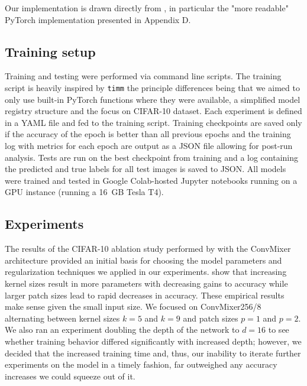 \documentclass[letterpaper]{article} %
\begin{document}
Our implementation is drawn directly from \citet{trockman2022patches}, in particular the "more readable" PyTorch implementation presented in Appendix D. 

\subsection{Training setup}

Training and testing were performed via command line scripts. The training script is heavily inspired by \verb|timm| \citep{rw2019timm} the principle differences being that we aimed to only use built-in PyTorch functions where they were available, a simplified model registry structure and the focus on CIFAR-10 dataset. Each experiment is defined in a YAML file and fed to the training script. Training checkpoints are saved only if the accuracy of the epoch is better than all previous epochs and the training log with metrics for each epoch are output as a JSON file allowing for post-run analysis. Tests are run on the best checkpoint from training and a log containing the predicted and true labels for all test images is saved to JSON. All models were trained and tested in Google Colab-hosted Jupyter notebooks running on a GPU instance (running a 16 GB Tesla T4).

\subsection{Experiments}

The results of the CIFAR-10 ablation study performed by \citet{trockman2022patches} with the ConvMixer architecture provided an initial basis for choosing the model parameters and regularization techniques we applied in our experiments. \citet{trockman2022patches} show that increasing kernel sizes result in more parameters with decreasing gains to accuracy while larger patch sizes lead to rapid decreases in accuracy. These empirical results make sense given the small input size. We focused on ConvMixer256/8 alternating between kernel sizes $k=5$ and $k=9$ and patch sizes $p=1$ and $p=2$. We also ran an experiment doubling the depth of the network to $d=16$ to see whether training behavior differed significantly with increased depth; however, we decided that the increased training time and, thus, our inability to iterate further experiments on the model in a timely fashion, far outweighed any accuracy increases we could squeeze out of it.
\end{document}
